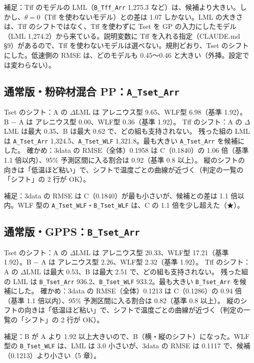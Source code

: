 \documentclass[paper=a4paper,fontsize=10.5pt,line_length=44zw,number_of_lines=40]{jlreq}
\begin{document}
補足：Tff のモデルの LML（\texttt{B\_\allowbreak{}Tff\_\allowbreak{}Arr} 1,275.3 など）は、候補より大きい。しかし、$\theta = 0$（Tff を使わないモデル）との差は 1.07 しかない。LML の大きさは、Tff のシフトではなく、Tff を使わずに Tset を GP の入力にしたモデル（LML 1,274.2）から来ている。説明変数に Tff を入れる指定（CLAUDE.md §9）があるので、Tff を使わないモデルは選べない。規則どおり、Tset のシフトにした。低速側の RMSE は、どのモデルも 0.45〜0.46 と大きい（外挿。設定では変わらない）。
\subsection{通常版・粉砕材混合 PP：\texttt{A\_\allowbreak{}Tset\_\allowbreak{}Arr}}
Tset のシフト：A の $\Delta$LML は アレニウス型 9.65、WLF型 6.98（基準 1.92）。B − A は アレニウス型 0.00、WLF型 0.36（基準 1.92）。 Tff のシフト：A の $\Delta$LML は最大 0.35、B は最大 0.62 で、どの組も支持されない。 残った組の LML は \texttt{A\_\allowbreak{}Tset\_\allowbreak{}Arr} 1,324.5、\texttt{A\_\allowbreak{}Tset\_\allowbreak{}WLF} 1,321.8。最も大きい \texttt{A\_\allowbreak{}Tset\_\allowbreak{}Arr} を候補にした。 確かめ：3data の RMSE（全体）0.1958 は C（0.1840）の 1.06 倍（基準 1.1 倍以内）、95\% 予測区間に入る割合は 0.92（基準 0.8 以上）。 縦のシフトの向きは「低温ほど粘い」で、シフトで温度ごとの曲線が近づく（判定の一覧の「シフト」の 2 行が OK）。


補足：3data の RMSE は C（0.1840）が最も小さいが、候補との差は 1.1 倍以内。WLF 型の \texttt{A\_\allowbreak{}Tset\_\allowbreak{}WLF}・\texttt{B\_\allowbreak{}Tset\_\allowbreak{}WLF} は、C の 1.1 倍を少し超えた（★）。
\subsection{通常版・GPPS：\texttt{B\_\allowbreak{}Tset\_\allowbreak{}Arr}}
Tset のシフト：A の $\Delta$LML は アレニウス型 20.33、WLF型 17.21（基準 1.92）。B − A は アレニウス型 2.26、WLF型 2.32（基準 1.92）。 Tff のシフト：A の $\Delta$LML は最大 0.53、B は最大 2.51 で、どの組も支持されない。 残った組の LML は \texttt{B\_\allowbreak{}Tset\_\allowbreak{}Arr} 936.2、\texttt{B\_\allowbreak{}Tset\_\allowbreak{}WLF} 933.2。最も大きい \texttt{B\_\allowbreak{}Tset\_\allowbreak{}Arr} を候補にした。 確かめ：3data の RMSE（全体）0.1213 は C（0.1286）の 0.94 倍（基準 1.1 倍以内）、95\% 予測区間に入る割合は 0.82（基準 0.8 以上）。 縦のシフトの向きは「低温ほど粘い」で、シフトで温度ごとの曲線が近づく（判定の一覧の「シフト」の 2 行が OK）。


補足：B が A より 1.92 以上大きいので、B（横・縦のシフト）になった。WLF 型の \texttt{B\_\allowbreak{}Tset\_\allowbreak{}WLF} は、LML は 3.0 小さいが、3data の RMSE は 0.1117 で、候補（0.1213）より小さい（5 章）。
\end{document}
